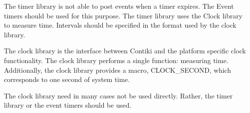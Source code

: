 The timer library is not able to post events when a timer expires. The Event timers should be used for this purpose.
The timer library uses the Clock library to measure time. Intervals should be specified in the format used by the clock library.

The clock library is the interface between Contiki and the platform specific clock functionality.
The clock library performs a single function: measuring time.
Additionally, the clock library provides a macro, CLOCK\_SECOND, which corresponds to one second of system time.

The clock library need in many cases not be used directly. Rather, the timer library or the event timers should be used.
